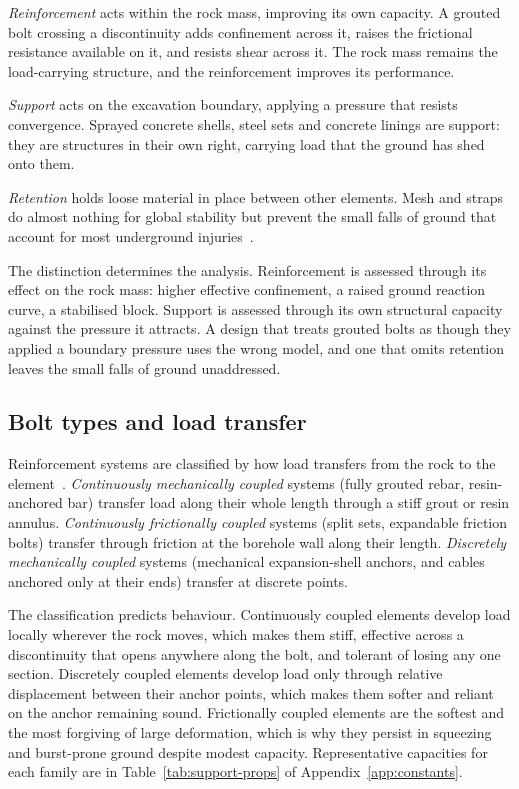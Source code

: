 \emph{Reinforcement} acts within the rock mass, improving its own capacity. A
grouted bolt crossing a discontinuity adds confinement across it, raises the
frictional resistance available on it, and resists shear across it. The rock
mass remains the load-carrying structure, and the reinforcement improves its
performance.

\emph{Support} acts on the excavation boundary, applying a pressure that
resists convergence. Sprayed concrete shells, steel sets and concrete linings are
support: they are structures in their own right, carrying load that the ground
has shed onto them.

\emph{Retention} holds loose material in place between other elements. Mesh
and straps do almost nothing for global stability but prevent the small
falls of ground that account for most underground
injuries~\citep{hoek1995support}.

The distinction determines the analysis. Reinforcement is assessed through its
effect on the rock mass: higher effective confinement, a raised ground
reaction curve, a stabilised block. Support is assessed through its own
structural capacity against the pressure it attracts. A design that treats
grouted bolts as though they applied a boundary pressure uses the wrong
model, and one that omits retention leaves the small falls of ground
unaddressed.

\subsection{Bolt types and load transfer}
\label{sec:bolt-types}

Reinforcement systems are classified by how load transfers from the
rock to the element~\citep{windsor1993classification}. \emph{Continuously mechanically coupled} systems (fully
grouted rebar, resin-anchored bar) transfer load along their whole length
through a stiff grout or resin annulus. \emph{Continuously frictionally
coupled} systems (split sets, expandable friction bolts) transfer through
friction at the borehole wall along their length. \emph{Discretely mechanically
coupled} systems (mechanical expansion-shell anchors, and cables anchored
only at their ends) transfer at discrete points.

The classification predicts behaviour. Continuously coupled elements develop
load locally wherever the rock moves, which makes them stiff, effective across
a discontinuity that opens anywhere along the bolt, and tolerant of losing any
one section. Discretely coupled elements develop load only through relative
displacement between their anchor points, which makes them softer and reliant
on the anchor remaining sound. Frictionally coupled elements are the softest
and the most forgiving of large deformation, which is why they persist in
squeezing and burst-prone ground despite modest capacity. Representative
capacities for each family are in Table~\ref{tab:support-props} of
Appendix~\ref{app:constants}.

